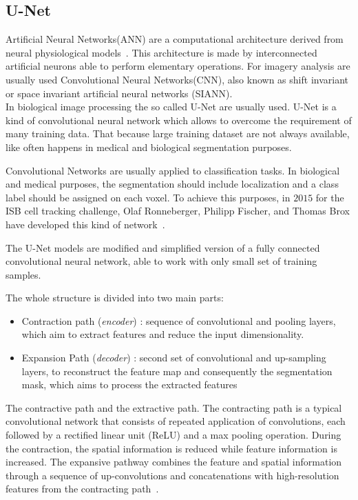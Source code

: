 \documentclass{standalone}
\begin{document}
		\subsection{U-Net}
		
		Artificial Neural Networks(ANN) are a computational architecture derived from neural physiological models~\cite{INP:Withey}. This architecture is made by interconnected artificial neurons able to perform elementary operations.  For imagery analysis are usually used Convolutional Neural Networks(CNN), also known as shift invariant or space invariant artificial neural networks (SIANN).\\
			
	
		In biological image processing 	the so called U-Net are usually used. U-Net is a kind of convolutional neural network which allows to overcome the requirement of many training data. That because large training dataset are not always available, like often happens in medical and biological segmentation purposes.
		
		Convolutional Networks are usually applied to classification tasks. In biological and medical purposes, the segmentation should include localization and a class label should be assigned on each voxel.
		To achieve this purposes, in $2015$ for the ISB cell tracking challenge, Olaf Ronneberger, Philipp Fischer, and Thomas Brox have developed this kind of network~\cite{ART:Johannes}.
		
		The U-Net models are modified and simplified version of a fully connected convolutional neural network, able to work with only small set of training samples.
	
		The whole structure is divided into two main parts:
		\begin{itemize}
			\item Contraction path (\textit{encoder}) : sequence of convolutional and pooling layers, which aim
			to extract features and reduce the input dimensionality. 
			
			\item Expansion Path (\textit{decoder}) : second set of convolutional and up-sampling layers, to reconstruct the
			feature map and consequently the segmentation mask, which aims to process the extracted features
		\end{itemize}
	
		The contractive path and the extractive path. The contracting path is a typical convolutional network that consists of repeated application of convolutions, each followed by a rectified linear unit (ReLU) and a max pooling operation. During the contraction, the spatial information is reduced while feature information is increased. The expansive pathway combines the feature and spatial information through a sequence of up-convolutions and concatenations with high-resolution features from the contracting path~\cite{ART:Johannes}.
		
\end{document}
